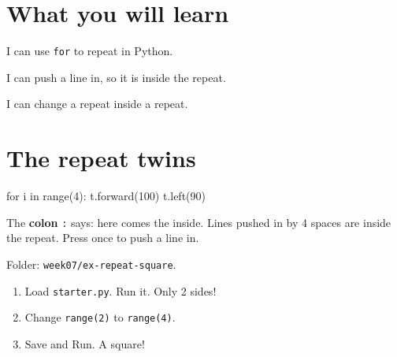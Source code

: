 
\section{What you will learn}
\begin{ican}
  \item I can use \texttt{for} to repeat in Python.
  \item I can push a line in, so it is inside the repeat.
  \item I can change a repeat inside a repeat.
\end{ican}

\section{The repeat twins}
\noindent
\begin{minipage}[c]{0.4\linewidth}
\centering
\begin{scratch}[scale=0.8]
\end{scratch}
\end{minipage}%
\begin{minipage}[c]{0.08\linewidth}
\centering\Large\textrightarrow
\end{minipage}%
\begin{minipage}[c]{0.52\linewidth}
\begin{pycode}
for i in range(4):
    t.forward(100)
    t.left(90)
\end{pycode}
\end{minipage}

\medskip
The \textbf{colon} \texttt{:} says: here comes the inside. Lines pushed in by 4 spaces are inside the repeat. Press  once to push a line in.

\begin{exercise}[Repeat 4]
Folder: \texttt{week07/ex-repeat-square}.
\begin{enumerate}[leftmargin=1.4em,itemsep=2pt]
  \item Load \texttt{starter.py}. Run it. Only 2 sides!
  \item Change \texttt{range(2)} to \texttt{range(4)}.
  \item Save and Run. A square!
\end{enumerate}
\end{exercise}

